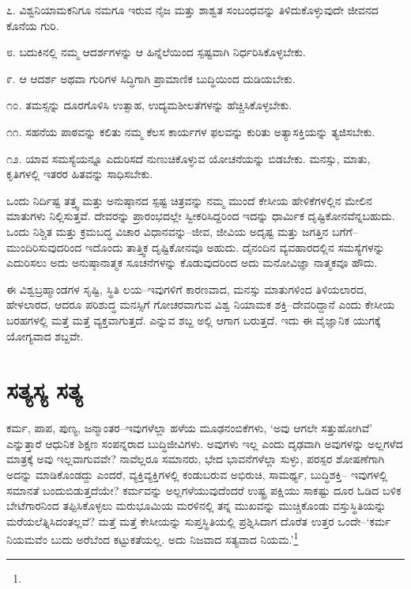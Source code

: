೭. ವಿಶ್ವನಿಯಾಮಕನಿಗೂ ನಮಗೂ ಇರುವ ನೈಜ ಮತ್ತು ಶಾಶ್ವತ ಸಂಬಂಧವನ್ನು ತಿಳಿದುಕೊಳ್ಳುವುದೇ ಜೀವನದ ಕೊನೆಯ ಗುರಿ.

೮. ಬದುಕಿನಲ್ಲಿ ನಮ್ಮ ಆದರ್ಶಗಳನ್ನು ಆ ಹಿನ್ನೆಲೆಯಿಂದ ಸ್ಪಷ್ಟವಾಗಿ ನಿರ್ಧರಿಸಿಕೊಳ್ಳಬೇಕು.

೯. ಆ ಆದರ್ಶ ಅಥವಾ ಗುರಿಗಳ ಸಿದ್ಧಿಗಾಗಿ ಪ್ರಾಮಾಣಿಕ ಬುದ್ಧಿಯಿಂದ ದುಡಿಯಬೇಕು.

೧೦. ತಮಸ್ಸನ್ನು ದೂರಗೊಳಿಸಿ ಉತ್ಸಾಹ, ಉದ್ಯಮಶೀಲತೆಗಳನ್ನು ಹೆಚ್ಚಿಸಿಕೊಳ್ಳಬೇಕು.

೧೧. ಸಹನೆಯ ಪಾಠವನ್ನು ಕಲಿತು ನಮ್ಮ ಕೆಲಸ ಕಾರ್ಯಗಳ ಫಲವನ್ನು ಕುರಿತು ಅತ್ಯಾಸಕ್ತಿಯನ್ನು ತ್ಯಜಿಸಬೇಕು.

೧೨. ಯಾವ ಸಮಸ್ಯೆಯನ್ನೂ ಎದುರಿಸದೆ ನುಣುಚಿಕೊಳ್ಳುವ ಯೋಚನೆಯನ್ನು ಬಿಡಬೇಕು. ಮನಸ್ಸು, ಮಾತು, ಕೃತಿಗಳಲ್ಲಿ ಇತರರ ಹಿತವನ್ನು ಸಾಧಿಸಬೇಕು.

ಒಂದು ನಿರ್ದಿಷ್ಟ ತತ್ತ್ವ ಮತ್ತು ಅನುಷ್ಠಾನದ ಸ್ಪಷ್ಟ ಚಿತ್ರವನ್ನು ನಮ್ಮ ಮುಂದೆ ಕೇಸೀಯ ಹೇಳಿಕೆಗಳಲ್ಲಿನ ಮೇಲಿನ ಮಾತುಗಳು ನಿಲ್ಲಿಸುತ್ತವೆ. ದೇವರನ್ನು ಪ್ರಾರಂಭದಲ್ಲೇ ಸ್ವೀಕರಿಸಿದ್ದರಿಂದ ಇದನ್ನು ಧಾರ್ಮಿಕ ದೃಷ್ಟಿಕೋನವೆನ್ನಬಹುದು. ಒಂದು ನಿಶ್ಚಿತ ಮತ್ತು ಕ್ರಮಬದ್ಧ ವಿಚಾರ ವಿಧಾನವನ್ನು–ಜೀವ, ಜೀವಿಯ ಅದೃಷ್ಟ ಮತ್ತು ಜಗತ್ತಿನ ಬಗೆಗೆ–ಮುಂದಿರಿಸುವುದರಿಂದ ಇದೊಂದು ತಾತ್ತ್ವಿಕ ದೃಷ್ಟಿಕೋನವೂ ಅಹುದು. ದೈನಂದಿನ ವ್ಯವಹಾರದಲ್ಲಿನ ಸಮಸ್ಯೆಗಳನ್ನು ಎದುರಿಸಲು ಅದು ಅನುಷ್ಠಾನಾತ್ಮಕ ಸೂಚನೆಗಳನ್ನು ಕೊಡುವುದರಿಂದ ಅದು ಮನೋವಿಜ್ಞಾ ನಾತ್ಮಕವೂ ಹೌದು.

ಈ ವಿಶ್ವಬ್ರಹ್ಮಾಂಡಗಳ ಸೃಷ್ಟಿ, ಸ್ಥಿತಿ ಲಯ–ಇವುಗಳಿಗೆ ಕಾರಣವಾದ, ಮನಸ್ಸು ಮಾತುಗಳಿಂದ ತಿಳಿಯಲಾರದ, ಹೇಳಲಾರದ, ಆದರೂ ಪರಿಶುದ್ಧ ಮನಸ್ಸಿಗೆ ಗೋಚರವಾಗುವ ವಿಶ್ವ ನಿಯಾಮಕ ಶಕ್ತಿ–ದೇವರಿದ್ದಾನೆ ಎಂದು ಕೇಸೀಯ ಬರಹಗಳಲ್ಲಿ ಮತ್ತೆ ಮತ್ತೆ ವ್ಯಕ್ತವಾಗುತ್ತದೆ.  ಎನ್ನುವ ಶಬ್ದ ಅಲ್ಲಿ ಆಗಾಗ ಬರುತ್ತದೆ. ಇದು ಈ ವೈಜ್ಞಾನಿಕ ಯುಗಕ್ಕೆ ಯೋಗ್ಯವಾದ ಶಬ್ದವೇ.


\section{ಸತ್ಯಸ್ಯ ಸತ್ಯ}

ಕರ್ಮ, ಪಾಪ, ಪುಣ್ಯ, ಜನ್ಮಾಂತರ–ಇವುಗಳೆಲ್ಲಾ ಹಳೆಯ ಮೂಢನಂಬಿಕೆಗಳು, ‘ಅವು ಆಗಲೇ ಸತ್ತುಹೋಗಿವೆ’ ಎನ್ನುತ್ತಾರೆ ಆಧುನಿಕ ಶಿಕ್ಷಣ ಸಂಪನ್ನರಾದ ಬುದ್ಧಿಜೀವಿಗಳು. ಅವುಗಳು ಇಲ್ಲ ಎಂದು ದೃಢವಾಗಿ ಅವುಗಳನ್ನು ಅಲ್ಲಗಳೆದ ಮಾತ್ರಕ್ಕೆ ಅವು ಇಲ್ಲವಾಗುವವೇ? ನಾವೆಲ್ಲರೂ ಸಮಾನರು, ಭೇದ ಭಾವನೆಗಳೆಲ್ಲಾ ಸುಳ್ಳು, ಪರಸ್ಪರ ಶೋಷಣೆಗಾಗಿ ಅದನ್ನು ಮಾಡಿಕೊಂಡದ್ದು ಎಂದರೆ, ವ್ಯಕ್ತಿವ್ಯಕ್ತಿಗಳಲ್ಲಿ ಕಂಡುಬರುವ ಅಭಿರುಚಿ, ಸಾಮರ್ಥ್ಯ, ಬುದ್ಧಿಶಕ್ತಿ– ಇವುಗಳಲ್ಲಿ ಸಮಾನತೆ ಬಂದುಬಿಡುತ್ತದೆಯೇ? ಕರ್ಮವನ್ನು ಅಲ್ಲಗಳೆಯುವುದೆಂದರೆ ಉಷ್ಟ್ರ ಪಕ್ಷಿಯು ಸಾಕಷ್ಟು ದೂರ ಓಡಿದ ಬಳಿಕ ಬೇಟೆಗಾರನಿಂದ ತಪ್ಪಿಸಿಕೊಳ್ಳಲು ಮರುಭೂಮಿಯ ಮರಳಿನಲ್ಲಿ ತನ್ನ ಮುಖವನ್ನು ಮುಚ್ಚಿಕೊಂಡು ವಸ್ತುಸ್ಥಿತಿಯನ್ನು ಮರೆಯಲೆತ್ನಿಸಿದಂತಲ್ಲವೆ? ಮತ್ತೆ ಮತ್ತೆ ಕೇಸೀಯನ್ನು ಸುಪ್ತಸ್ಥಿತಿಯಲ್ಲಿ ಪ್ರಶ್ನಿಸಿದಾಗ ದೊರೆತ ಉತ್ತರ ಒಂದೇ–‘ಕರ್ಮ ನಿಯಮವೆಂ ಬುದು ಅರೆಬೆಂದ ಕಟ್ಟುಕತೆಯಲ್ಲ. ಅದು ನಿಜವಾದ ಸತ್ಯವಾದ ನಿಯಮ.’\footnote{}


